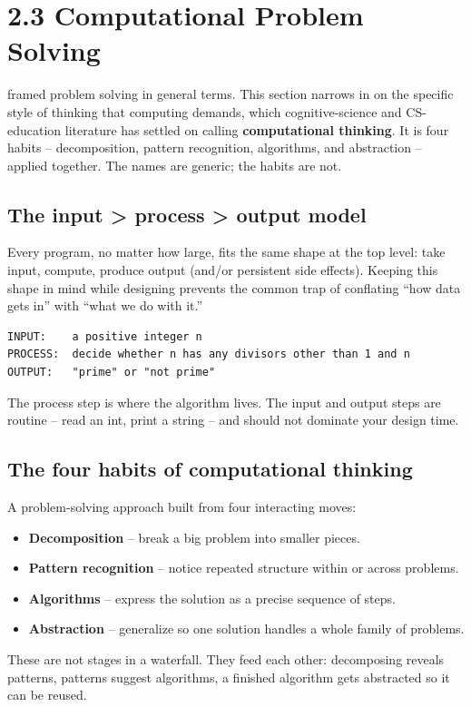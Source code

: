 \documentclass[11pt]{article}
\begin{document}
\section{2.3 Computational Problem Solving}

 framed problem solving in general terms. This section
narrows in on the specific style of thinking that computing demands,
which cognitive-science and CS-education literature has settled on
calling \textbf{computational thinking}. It is four habits --
decomposition, pattern recognition, algorithms, and abstraction --
applied together. The names are generic; the habits are not.

\subsection{The input > process > output model}

Every program, no matter how large, fits the same shape at the top
level: take input, compute, produce output (and/or persistent side
effects). Keeping this shape in mind while designing prevents the
common trap of conflating ``how data gets in'' with ``what we do with
it.''

\begin{examplebox}
\begin{verbatim}
INPUT:    a positive integer n
PROCESS:  decide whether n has any divisors other than 1 and n
OUTPUT:   "prime" or "not prime"
\end{verbatim}
The process step is where the algorithm lives. The input and output
steps are routine -- read an int, print a string -- and should not
dominate your design time.
\end{examplebox}

\subsection{The four habits of computational thinking}

\begin{defnbox}
A problem-solving approach built from four interacting moves:
\begin{itemize}[leftmargin=*,noitemsep]
    \item \textbf{Decomposition} -- break a big problem into smaller
          pieces.
    \item \textbf{Pattern recognition} -- notice repeated structure
          within or across problems.
    \item \textbf{Algorithms} -- express the solution as a precise
          sequence of steps.
    \item \textbf{Abstraction} -- generalize so one solution handles a
          whole family of problems.
\end{itemize}
These are not stages in a waterfall. They feed each other: decomposing
reveals patterns, patterns suggest algorithms, a finished algorithm
gets abstracted so it can be reused.
\end{defnbox}
\end{document}

